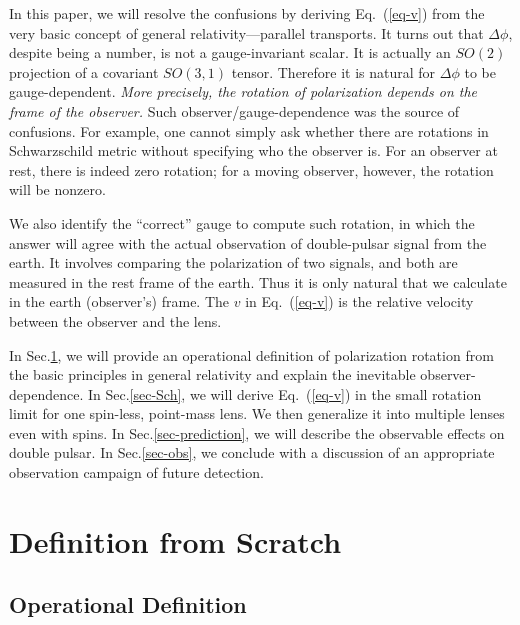 \documentclass[aps,showpacs,twocolumn,floats,prd,superscriptaddress,nofootinbib]{revtex4-1}
\begin{document}
In this paper, we will resolve the confusions by deriving Eq.~(\ref{eq-v}) from the very basic concept of general relativity---parallel transports. 
It turns out that $\Delta\phi$, despite being a number, is not a gauge-invariant scalar.
It is actually an $SO(2)$ projection of a covariant $SO(3,1)$ tensor.
Therefore it is natural for $\Delta\phi$ to be gauge-dependent.
 {\it More precisely, the rotation of polarization depends on the frame of the observer. }
Such observer/gauge-dependence was the source of confusions.
For example, one cannot simply ask whether there are rotations in Schwarzschild metric without specifying who the observer is.
For an observer at rest, there is indeed zero rotation; 
for a moving observer, however, the rotation will be nonzero.

We also identify the ``correct'' gauge to compute such rotation, in which the answer will agree with the actual observation of double-pulsar signal from the earth.
It involves comparing the polarization of two signals, and both are measured in the rest frame of the earth.
Thus it is only natural that we calculate in the earth (observer's) frame.
The $v$ in Eq.~(\ref{eq-v}) is the relative velocity between the observer and the lens.

In Sec.\ref{sec-born}, we will provide an operational definition of polarization rotation from the basic principles in general relativity and explain the inevitable observer-dependence.
In Sec.\ref{sec-Sch}, we will derive Eq.~(\ref{eq-v}) in the small rotation limit for one spin-less, point-mass lens. 
We then generalize it into multiple lenses even with spins.
In Sec.\ref{sec-prediction}, we will describe the observable effects on double pulsar. 
In Sec.\ref{sec-obs}, we conclude with a discussion of an appropriate observation campaign of future detection.

\section{Definition from Scratch}
\label{sec-born}

\subsection{Operational Definition}
\end{document}
